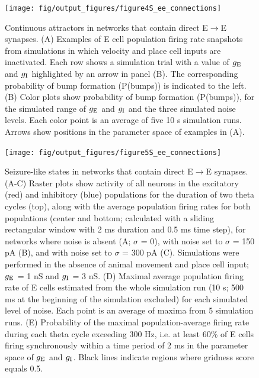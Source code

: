 \documentclass[a4paper,12pt]{article}
\newcommand{\ssc}[3]{\ensuremath{#1_{\text{#2}_{\text{#3}}}}}
\newcommand{\gE      }{\ssc{g}      {\scriptsize{E}}{}}
\newcommand{\gI      }{\ssc{g}      {\scriptsize{I}}{}}
\begin{document}
\clearpage

\begin{figure}[p]
    \internallinenumbers
    \centering
        \texttt{[image: fig/output\_figures/figure4S\_ee\_connections]}
    \caption{Continuous attractors in networks that contain direct
    E$\rightarrow$E synapses. (A) Examples of E cell population firing rate
    snapshots from simulations in which velocity and place cell inputs are
    inactivated. Each row shows a simulation trial with a value of $\gE$ and
    $\gI$
    highlighted by an arrow in panel (B). The corresponding probability of bump
    formation (P(bumps)) is indicated to the left.  (B) Color plots show
    probability of bump formation (P(bumps)), for the simulated range of $\gE$ and
    $\gI$ and the three simulated noise levels. Each color point is an average of
    five 10 s simulation runs. Arrows show positions in the parameter space of
    examples in (A).}
\end{figure}

\clearpage

\begin{figure}[p]
    \internallinenumbers
    \centering
        \texttt{[image: fig/output\_figures/figure5S\_ee\_connections]}
\end{figure}

\clearpage


\begin{figure}[H]
    \internallinenumbers
    \caption{Seizure-like states in networks that contain direct
    E$\rightarrow$E synapses. (A-C) Raster plots show activity of all neurons
    in the excitatory (red) and inhibitory (blue) populations for the duration
    of two theta cycles (top), along with the average population firing rates
    for both populations (center and bottom; calculated with a sliding
    rectangular window with 2 ms duration and 0.5 ms time step), for networks
    where noise is absent (A; $\sigma$ = 0), with noise set to $\sigma$ = 150
    pA (B), and with noise set to $\sigma$ = 300 pA (C). Simulations were
    performed in the absence of animal movement and place cell input; $\gE$ = 1 nS
    and $\gI$ = 3 nS.  (D) Maximal average population firing rate of E cells
    estimated from the whole simulation run (10 s; 500 ms at the beginning of
    the simulation excluded) for each simulated level of noise. Each point is
    an average of maxima from 5 simulation runs.  (E) Probability of the
    maximal population-average firing rate during each theta cycle exceeding
    300 Hz, i.e. at least 60\% of E cells firing synchronously within a time
    period of 2 ms in the parameter space of $\gE$ and $\gI$. Black lines indicate
    regions where gridness score equals 0.5.}
\end{figure}
\end{document}
